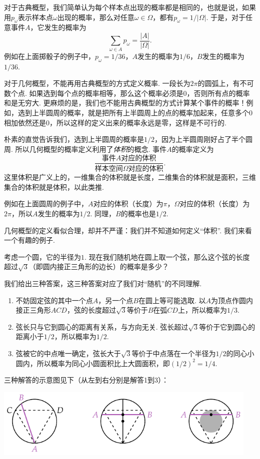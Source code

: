 对于古典概型，我们简单认为每个样本点出现的概率都是相同的，也就是说，如果用$p_\omega$表示样本点$\omega$出现的概率，那么对任意$\omega\in\Omega$，都有$p_\omega = 1/|\Omega|$. 于是，对于任意事件$A$，它发生的概率为
\[
    \sum_{\omega\in A} p_\omega = \frac{|A|}{|\Omega|}.
\]
例如在上面掷骰子的例子中，$p_\omega=1/36$，$A$发生的概率为$1/6$，$B$发生的概率为$1/36$.

对于几何概型，不能再用古典概型的方式定义概率. 一段长为$2\pi$的圆弧上，有不可数个点. 如果选到每个点的概率相等，那么这个概率必须是$0$，否则所有点的概率和是无穷大. 更麻烦的是，我们也不能用古典概型的方式计算某个事件的概率！例如，选到上半圆周的概率，就是把所有上半圆周上的点的概率加起来，任意多个$0$相加依然还是$0$，所以这样的定义出来的概率永远是零，这样是不可行的. 

朴素的直觉告诉我们，选到上半圆周的概率是$1/2$，因为上半圆周刚好占了半个圆周. 所以几何概型的概率定义利用了\emph{体积}的概念. 事件$A$的概率定义为
\[
    \frac{\text{事件$A$对应的体积}}{\text{样本空间$\Omega$对应的体积}}.
\]
这里体积是广义上的，一维集合的体积就是长度，二维集合的体积就是面积，三维集合的体积就是体积，以此类推. 

例如在上面圆周的例子中，$A$对应的体积（长度）为$\pi$，$\Omega$对应的体积（长度）为$2\pi$，所以$A$发生的概率为$1/2$. 同理，$B$的概率也是$1/2$.

几何概型的定义看似合理，却并不严谨：我们并不知道如何定义“体积”. 我们来看一个有趣的例子. 

\begin{example}[Bertrand悖论]
考虑一个圆，它的半径为$1$. 现在我们随机地在圆上取一个弦，那么这个弦的长度超过$\sqrt{3}$（即圆内接正三角形的边长）的概率是多少？

我们给出三种答案，这三种答案对应了我们对“随机”的不同理解.

\begin{enumerate}[label=\textbf{解答\arabic*.},fullwidth,itemindent=2em]
    \item 不妨固定弦的其中一个点$A$，另一个点$B$在圆上等可能选取. 以$A$为顶点作圆内接正三角形$ACD$，弦的长度超过$\sqrt{3}$等价于$B$在弧$CD$上，所以概率为$1/3$.
    \item 弦长只与它到圆心的距离有关系，与方向无关. 弦长超过$\sqrt{3}$等价于它到圆心的距离小于$1/2$，所以概率为$1/2$.
    \item 弦被它的中点唯一确定，弦长大于$\sqrt{3}$等价于中点落在一个半径为$1/2$的同心小圆内，所以概率为同心小圆面积比上大圆面积，即$(1/2)^2=1/4$.
\end{enumerate}
三种解答的示意图见下（从左到右分别是解答1到3）：
\begin{center}
\includegraphics[width=0.95\textwidth]{Figures/prob/Bertrand-paradox.pdf}
\end{center}
\end{example}

